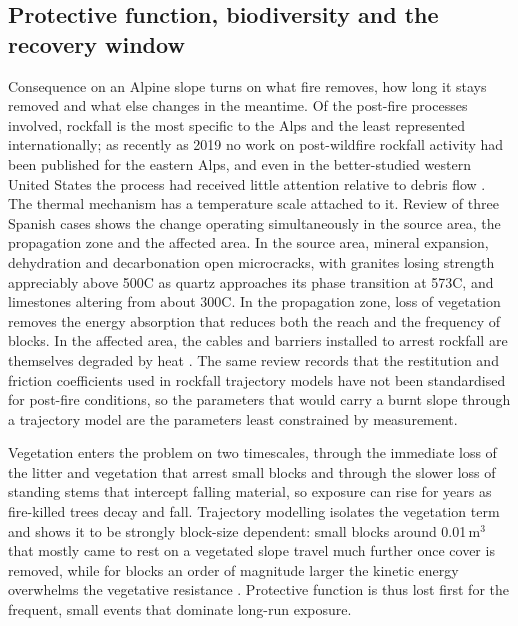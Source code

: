 \documentclass[11pt,a4paper]{article}
\begin{document}
\subsection{Protective function, biodiversity and the recovery window}

Consequence on an Alpine slope turns on what fire removes, how long it stays removed and what else changes in the meantime. Of the post-fire processes involved, rockfall is the most specific to the Alps and the least represented internationally; as recently as 2019 no work on post-wildfire rockfall activity had been published for the eastern Alps, and even in the better-studied western United States the process had received little attention relative to debris flow \citep{melzner_brief_2019}. The thermal mechanism has a temperature scale attached to it. Review of three Spanish cases shows the change operating simultaneously in the source area, the propagation zone and the affected area. In the source area, mineral expansion, dehydration and decarbonation open microcracks, with granites losing strength appreciably above 500\degree{}C as quartz approaches its phase transition at 573\degree{}C, and limestones altering from about 300\degree{}C. In the propagation zone, loss of vegetation removes the energy absorption that reduces both the reach and the frequency of blocks. In the affected area, the cables and barriers installed to arrest rockfall are themselves degraded by heat \citep{sarro_effects_2021}. The same review records that the restitution and friction coefficients used in rockfall trajectory models have not been standardised for post-fire conditions, so the parameters that would carry a burnt slope through a trajectory model are the parameters least constrained by measurement.

Vegetation enters the problem on two timescales, through the immediate loss of the litter and vegetation that arrest small blocks and through the slower loss of standing stems that intercept falling material, so exposure can rise for years as fire-killed trees decay and fall. Trajectory modelling isolates the vegetation term and shows it to be strongly block-size dependent: small blocks around 0.01\,m$^3$ that mostly came to rest on a vegetated slope travel much further once cover is removed, while for blocks an order of magnitude larger the kinetic energy overwhelms the vegetative resistance \citep{asteriou_assessing_2025}. Protective function is thus lost first for the frequent, small events that dominate long-run exposure.
\end{document}
